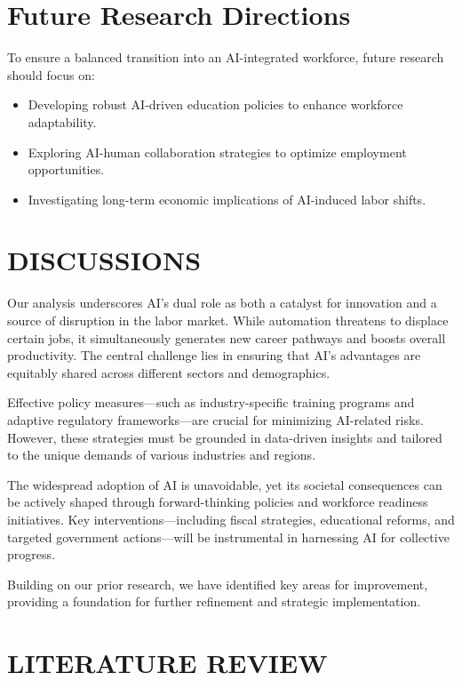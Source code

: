 \documentclass[a4paper,headinclude=on,footinclude=on,12pt,oneside]{scrbook}
\begin{document}
\section*{Future Research Directions}

To ensure a balanced transition into an AI-integrated workforce, future research should focus on:
\begin{itemize}
	\item Developing robust AI-driven education policies to enhance workforce adaptability.
	\item Exploring AI-human collaboration strategies to optimize employment opportunities.
	\item Investigating long-term economic implications of AI-induced labor shifts.
\end{itemize}

\section*{DISCUSSIONS}

Our analysis underscores AI’s dual role as both a catalyst for innovation and a source of disruption in the labor market. While automation threatens to displace certain jobs, it simultaneously generates new career pathways and boosts overall productivity. The central challenge lies in ensuring that AI’s advantages are equitably shared across different sectors and demographics.

Effective policy measures—such as industry-specific training programs and adaptive regulatory frameworks—are crucial for minimizing AI-related risks. However, these strategies must be grounded in data-driven insights and tailored to the unique demands of various industries and regions.

The widespread adoption of AI is unavoidable, yet its societal consequences can be actively shaped through forward-thinking policies and workforce readiness initiatives. Key interventions—including fiscal strategies, educational reforms, and targeted government actions—will be instrumental in harnessing AI for collective progress.

Building on our prior research, we have identified key areas for improvement, providing a foundation for further refinement and strategic implementation.

\section*{LITERATURE REVIEW}
\end{document}
